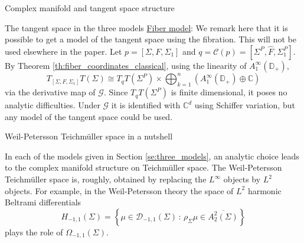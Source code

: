 \documentclass[12pt]{amsart}
\newcommand{\disk}{\ensuremath{\mathbb{D}} } %
\newcommand{\riem}{\Sigma}  %
\theoremstyle{plain}
\theoremstyle{definition}
\theoremstyle{remark}
\numberwithin{equation}{section} %
\numberwithin{figure}{section} %
\begin{document}
\begin{section}{Complex manifold and tangent space structure}
\begin{subsection}{The tangent space in the three models}
 {\underline{Fiber model}}: We remark here that it is possible to get a model of the tangent space using the fibration. This will not be used elsewhere in the paper.
  Let $p = [\riem,F,\riem_1]$ and $q = \mathcal{C}(p) = [\riem^P,\hat{F},\riem_1^P]$. By Theorem \ref{th:fiber_coordinates_classical}, using the linearity of $A_1^\infty(\disk_+)$, 
  \[ T_{[\riem,F,\riem_1]} T(\riem) \cong T_q T(\riem^P) \times \bigoplus_{k=1}^n \left(A_1^\infty(\disk_+) \oplus \mathbb{C} \right)   \]
  via the derivative map of $\mathcal{G}$.  
  Since $T_q T(\riem^P)$ is finite dimensional, it poses no analytic difficulties. Under $\mathcal{G}$ it is identified with $\mathbb{C}^d$ using Schiffer variation, but any model of the tangent space could be used.   
\end{subsection}
\begin{subsection}{Weil-Petersson Teichm\"uller space in a nutshell}
 
 
In each of the models given in Section \ref{se:three_models}, an analytic choice leads to the complex manifold structure on Teichm\"uller space.  The Weil-Petersson Teichm\"uller space is, roughly, obtained by replacing the $L^\infty$ objects by $L^2$ objects. For example, in the Weil-Petersson theory the space of $L^2$ harmonic Beltrami differentials 
\[ H_{-1,1}(\riem) = \left\{ \mu \in \mathscr{D}_{-1,1}(\riem) \,: \, 
 \rho_\riem \mu \in \overline{A_2^2(\riem)}  \right\} \]
plays the role of $\Omega_{-1,1}(\riem)$.


\end{subsection}
\end{section}
\end{document}
